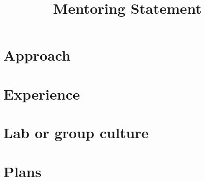 \documentclass[11pt,letterpaper]{article}
\title{Mentoring Statement}
\author{\docauthor}
\date{}
\begin{document}
\maketitle
\thispagestyle{empty}

\section*{Approach}

\section*{Experience}

\section*{Lab or group culture}

\section*{Plans}
\end{document}
